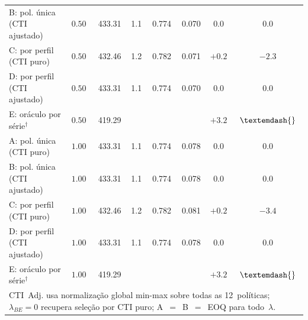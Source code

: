 \begin{table}[htb]
\begin{tabular}{@{}p{3.4cm}crrrrcc@{}}
B: pol. única (CTI ajustado) & $0.50$ & 433.31 & 1.1 & 0.774 & 0.070 & $0.0$ & $0.0$ \\
C: por perfil (CTI puro) & $0.50$ & 432.46 & 1.2 & 0.782 & 0.071 & $+0.2$ & $-2.3$ \\
D: por perfil (CTI ajustado) & $0.50$ & 433.31 & 1.1 & 0.774 & 0.070 & $0.0$ & $0.0$ \\
E: oráculo por série$^\dagger$ & $0.50$ & 419.29 & \textemdash{} & \textemdash{} & \textemdash{} & $+3.2$ & $\textemdash{}$ \\
\midrule
A: pol. única (CTI puro) & $1.00$ & 433.31 & 1.1 & 0.774 & 0.078 & $0.0$ & $0.0$ \\
B: pol. única (CTI ajustado) & $1.00$ & 433.31 & 1.1 & 0.774 & 0.078 & $0.0$ & $0.0$ \\
C: por perfil (CTI puro) & $1.00$ & 432.46 & 1.2 & 0.782 & 0.081 & $+0.2$ & $-3.4$ \\
D: por perfil (CTI ajustado) & $1.00$ & 433.31 & 1.1 & 0.774 & 0.078 & $0.0$ & $0.0$ \\
E: oráculo por série$^\dagger$ & $1.00$ & 419.29 & \textemdash{} & \textemdash{} & \textemdash{} & $+3.2$ & $\textemdash{}$ \\
\bottomrule
\multicolumn{8}{l}{\scriptsize CTI~Adj. usa normalização global min-max sobre todas as 12~políticas; $\lambda_{BE}=0$ recupera seleção por CTI puro; A~$=$~B~$=$~EOQ para todo~$\lambda$.} \\
\end{tabular}
\end{table}